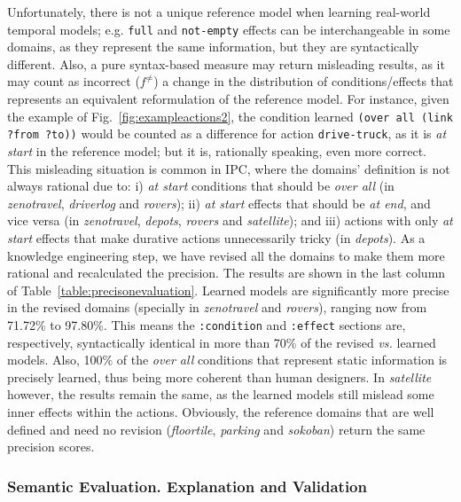 \documentclass[10pt,journal,compsoc]{IEEEtran}
\begin{document}
Unfortunately, there is not a unique reference model when learning real-world temporal models; e.g. \texttt{full} and \texttt{not-empty} effects can be interchangeable in some domains, as they represent the same information, but they are syntactically different.
Also, a pure syntax-based measure may return misleading results, as it may count as incorrect ($f^{\neq}$) a change in the distribution of conditions/effects that represents an equivalent reformulation of the reference model. For instance, given the example of Fig.~\ref{fig:exampleactions2}, the condition learned \texttt{(over all (link ?from ?to))} would be counted as a difference for action \texttt{drive-truck}, as it is \textit{at start} in the reference model; but it is, rationally speaking, even more correct. 
This misleading situation is common in IPC, where the domains' definition is not always rational due to: i) \textit{at start} conditions that should be \textit{over all} (in \emph{zenotravel}, \emph{driverlog} and \emph{rovers}); ii) \textit{at start} effects that should be \textit{at end}, and vice versa (in \emph{zenotravel}, \emph{depots}, \emph{rovers} and \emph{satellite}); and iii) actions with only \textit{at start} effects that make durative actions unnecessarily tricky (in \emph{depots}).
As a knowledge engineering step, we have revised all the domains to make them more rational and recalculated the precision. The results are shown in the last column of Table~\ref{table:precisonevaluation}.
Learned models are significantly more precise in the revised domains (specially in \emph{zenotravel} and \textit{rovers}), ranging now from 71.72\% to 97.80\%. 
This means the \texttt{:condition} and \texttt{:effect} sections are, respectively, syntactically identical in more than 70\% of the revised \textit{vs.} learned models.
Also, 100\% of the \textit{over all} conditions that represent static information is precisely learned, thus being more coherent than human designers.
In \emph{satellite} however, the results remain the same, as the learned models still mislead some inner effects within the actions.
Obviously, the reference domains that are well defined and need no revision (\emph{floortile}, \emph{parking} and \emph{sokoban}) return the same precision scores.




\subsubsection{Semantic Evaluation. Explanation and Validation}
\end{document}
